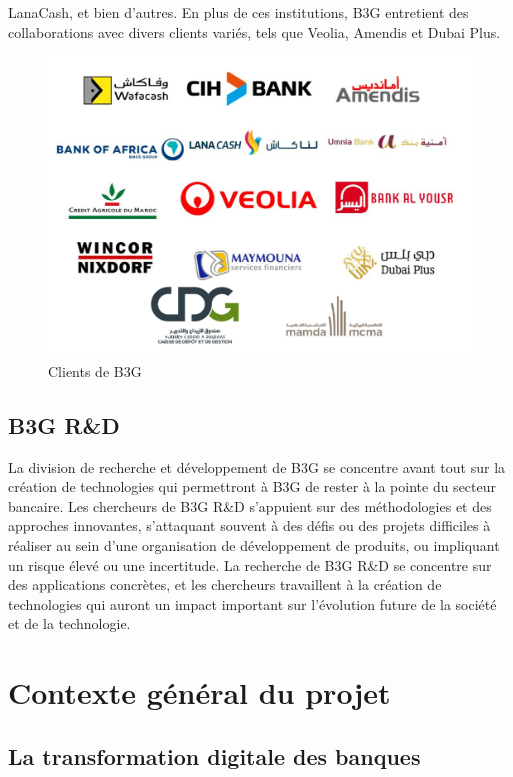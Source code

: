 LanaCash, et bien d'autres. En plus de ces institutions, B3G entretient des collaborations avec divers clients variés, tels que Veolia, Amendis et Dubai Plus.

\begin{figure}[H]
    \centering
    \includegraphics[width=12cm]{Figures/clients.png}
    \caption{Clients de B3G}
    \label{fig:my_label} %
\end{figure}

\subsection{B3G R\&D}

\hspace{\parindent}La division de recherche et développement de B3G se concentre avant tout sur la création de technologies qui permettront à B3G de rester à la pointe du secteur bancaire. Les chercheurs de B3G R\&D s'appuient sur des méthodologies et des approches innovantes, s'attaquant souvent à des défis ou des projets difficiles à réaliser au sein d'une organisation de développement de produits, ou impliquant un risque élevé ou une incertitude. La recherche de B3G R\&D se concentre sur des applications concrètes, et les chercheurs travaillent à la création de technologies qui auront un impact important sur l'évolution future de la société et de la technologie.

\section{Contexte général du projet}
\subsection{La transformation digitale des banques}

